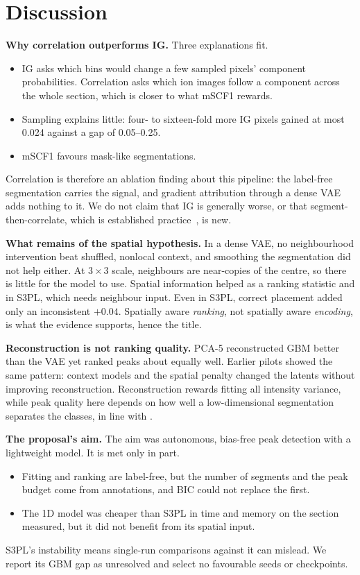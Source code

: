 \section{Discussion}
\label{sec:discussion}

\textbf{Why correlation outperforms IG.} Three explanations fit.
\begin{itemize}
  \item IG asks which bins would change a few sampled pixels' component
        probabilities. Correlation asks which ion images follow a component
        across the whole section, which is closer to what mSCF1 rewards.
  \item Sampling explains little: four- to sixteen-fold more IG pixels gained at
        most 0.024 against a gap of 0.05--0.25.
  \item mSCF1 favours mask-like segmentations.
\end{itemize}
Correlation is therefore an ablation finding about this pipeline: the
label-free segmentation carries the signal, and gradient attribution through a
dense VAE adds nothing to it. We do not claim that IG is generally worse, or
that segment-then-correlate, which is established
practice~\citep{alexandrov2011efficient}, is new.

\textbf{What remains of the spatial hypothesis.} In a dense VAE, no
neighbourhood intervention beat shuffled, nonlocal context, and smoothing the
segmentation did not help either. At $3\times3$ scale, neighbours are
near-copies of the centre, so there is little for the model to use. Spatial
information helped as a ranking statistic and in S3PL, which needs neighbour
input. Even in S3PL, correct placement added only an inconsistent $+0.04$.
Spatially aware \emph{ranking}, not spatially aware \emph{encoding}, is what
the evidence supports, hence the title.

\textbf{Reconstruction is not ranking quality.} PCA-5 reconstructed GBM better
than the VAE yet ranked peaks about equally well. Earlier pilots showed the
same pattern: context models and the spatial penalty changed the latents
without improving reconstruction. Reconstruction rewards fitting all intensity
variance, while peak quality here depends on how well a low-dimensional
segmentation separates the classes, in line with
\citet{mazarura2025autoencoder}.

\textbf{The proposal's aim.} The aim was autonomous, bias-free peak detection
with a lightweight model. It is met only in part.
\begin{itemize}
  \item Fitting and ranking are label-free, but the number of segments and the
        peak budget come from annotations, and BIC could not replace the first.
  \item The 1D model was cheaper than S3PL in time and memory on the section
        measured, but it did not benefit from its spatial input.
\end{itemize}
S3PL's instability means single-run comparisons against it can mislead. We
report its GBM gap as unresolved and select no favourable seeds or
checkpoints.

